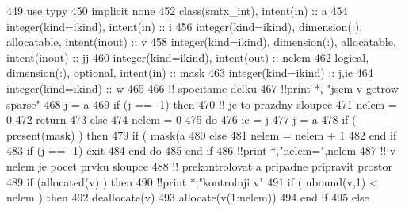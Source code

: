 \begin{DoxyCode}
449         \textcolor{keywordtype}{use }typy
450         \textcolor{keywordtype}{implicit none}
452         \textcolor{keywordtype}{class}(smtx\_int), \textcolor{keywordtype}{intent(in)} :: a
454         \textcolor{keywordtype}{integer(kind=ikind)}, \textcolor{keywordtype}{intent(in)} :: i
456         \textcolor{keywordtype}{integer(kind=ikind)}, \textcolor{keywordtype}{dimension(:)}, \textcolor{keywordtype}{allocatable}, \textcolor{keywordtype}{intent(inout)} :: v
458         \textcolor{keywordtype}{integer(kind=ikind)}, \textcolor{keywordtype}{dimension(:)}, \textcolor{keywordtype}{allocatable}, \textcolor{keywordtype}{intent(inout)} :: jj
460         \textcolor{keywordtype}{integer(kind=ikind)}, \textcolor{keywordtype}{intent(out)} :: nelem
462         \textcolor{keywordtype}{logical}, \textcolor{keywordtype}{dimension(:)}, \textcolor{keywordtype}{optional}, \textcolor{keywordtype}{intent(in)} :: mask
463         \textcolor{keywordtype}{integer(kind=ikind)} :: j,ic
464         \textcolor{keywordtype}{integer(kind=ikind)} :: w
465 
466         \textcolor{comment}{!! spocitame delku
}
467         \textcolor{comment}{!!print *, "jsem v getrow sparse"
}
468         j = a%
469         \textcolor{keywordflow}{if} (j == -1) then
470             \textcolor{comment}{!! je to prazdny sloupec
}
471             nelem = 0
472             return
473         else
474             nelem = 0
475             do
476                 ic = j
477                 j = a%
478                 \textcolor{keywordflow}{if} ( \textcolor{keyword}{present}(mask) ) then
479                     \textcolor{keywordflow}{if} ( mask(a%
480                 else
481                     nelem = nelem + 1
482 \textcolor{keyword}{                end }if
483                 \textcolor{keywordflow}{if} (j == -1) exit
484 \textcolor{keyword}{            end }do
485 \textcolor{keyword}{        end }if
486         \textcolor{comment}{!!print *,"nelem=",nelem
}
487         \textcolor{comment}{!! v nelem je pocet prvku sloupce
}
488         \textcolor{comment}{!! prekontrolovat a pripadne pripravit prostor
}
489         \textcolor{keywordflow}{if} (\textcolor{keyword}{allocated}(v) ) then
490             \textcolor{comment}{!!print *,"kontroluji v"
}
491             \textcolor{keywordflow}{if} ( ubound(v,1) < nelem ) then
492                 \textcolor{keyword}{deallocate}(v)
493                 \textcolor{keyword}{allocate}(v(1:nelem))
494 \textcolor{keyword}{            end }if
495         else

\end{DoxyCode}
